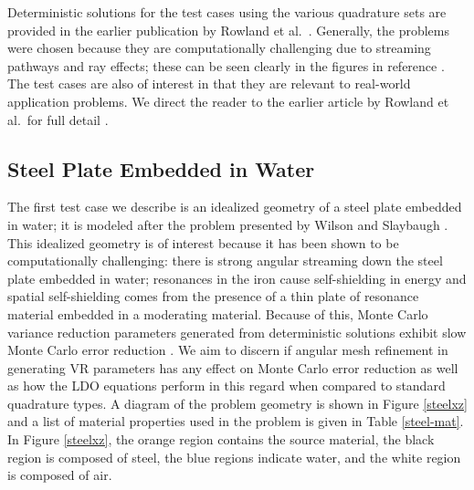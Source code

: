 \documentclass{article} %
\begin{document}
Deterministic solutions for the test cases using the various quadrature sets are
provided in the earlier publication by Rowland et al.\ \cite{kr18}. Generally,
the problems were chosen because they are computationally challenging due to
streaming pathways and ray effects; these can be seen clearly in the figures in reference \cite{kr18}. The test cases are also of interest in that they are
relevant to real-world application problems. We direct the reader to the earlier
article by Rowland et al.\ for full detail \cite{kr18}.

\subsection{Steel Plate Embedded in Water}
\label{sec:steel_params}

The first test case we describe is an idealized geometry of a steel plate
embedded in water; it is modeled after the problem presented by Wilson and
Slaybaugh \cite{wilsonslaybaugh}. This idealized geometry is of interest
because it has been shown to be computationally challenging: there is strong angular streaming down the steel plate embedded in water; resonances in the
iron cause self-shielding in energy and spatial self-shielding comes from the
presence of a thin plate of resonance material embedded in a moderating
material. Because of this, Monte Carlo variance reduction parameters generated
from deterministic solutions exhibit slow Monte Carlo error reduction
\cite{wilsonslaybaugh}. We aim to discern if angular mesh refinement in
generating VR parameters has any effect on Monte Carlo error reduction as well
as how the LDO equations perform in this regard when compared to standard
quadrature types. A diagram of the problem geometry is shown in Figure
\ref{steelxz} and a list of material properties used in the problem is given
in Table \ref{steel-mat}. In Figure \ref{steelxz}, the orange region contains
the source material, the black region is composed of steel, the blue regions
indicate water, and the white region is composed of air.
\end{document}
